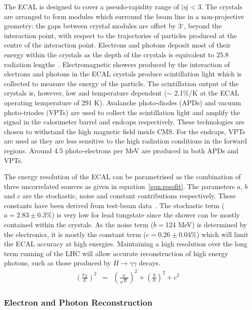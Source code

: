 The ECAL is designed to cover a pseudo-rapidity range of $|\eta | < 3$. 
The crystals are arranged to form modules which surround the beam line in a non-projective geometry:
the gaps between crystal modules are offset by 3$^{\circ}$, beyond the interaction point, with respect to 
the trajectories of particles produced at the centre of the interaction point. 
Electrons and photons deposit most of their energy within 
the crystals as the depth of the crystals is equivalent to 25.8 radiation lengths~\citep{TDR1}. 
Electromagnetic showers produced by the interaction of electrons and photons in the ECAL crystals
produce scintillation light which is collected to measure the energy of the particle. 
The scintillation output of the crystals is, however, low and temperature dependent 
($\sim$ 2.1\%/K at the ECAL operating temperature of 291 K). 
Avalanche photo-diodes (APDs) and vacuum 
photo-triodes (VPTs) are used to collect the scintillation light and amplify the signal in the 
calorimeter barrel and endcaps respectively. 
These technologies are chosen to withstand the high magnetic field inside CMS.
For the endcaps, VPTs are used as they are less sensitive to the high radiation conditions  
in the forward regions. Around 4.5 photo-electrons per MeV are produced in both APDs and VPTs. 

The energy resolution of the ECAL can be parametrised as the combination of three 
uncorrelated sources as given in equation~\ref{eqn:resofit}.
The parameters $a$, $b$ and $c$ are the stochastic, noise and constant contributions respectively. 
These constants have been derived from test-beam data~\citep{AN-06-140}.
The stochastic term ($a=2.83\pm0.3\%$) is very low for lead tungstate since the shower 
can be mostly contained within the crystals.
As the noise term ($b=$124 MeV) is determined by the electronics, 
it is mostly the constant term ($c=0.26\pm0.04\%$) which will limit the ECAL accuracy at 
high energies. Maintaining a high resolution 
over the long term running of the LHC will allow accurate reconstruction of high energy photons, 
such as those produced by $H \rightarrow \gamma\gamma$ decays.
\begin{eqnarray}
\left( \frac{\displaystyle \sigma_{E}}{\displaystyle E} \right)^ 2 
	& = & \left( \frac{\displaystyle a}{\displaystyle \sqrt{E}} \right)^ 2 
  	+ \left( \frac{\displaystyle b}{\displaystyle {E}} \right)^ 2 + c^ 2
\label{eqn:resofit}
\end{eqnarray}


\subsubsection{Electron and Photon Reconstruction}

